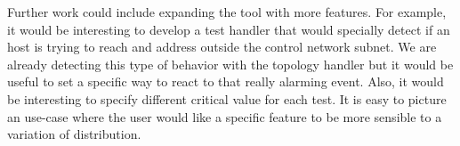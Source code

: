 \documentclass[12pt,journal,compsoc]{IEEEtran}
\begin{document}
\begin{empfile}
Further work could include expanding the tool with more features. For example, it would be interesting to develop a test handler that would specially detect if an host is trying to reach and address outside the control network subnet. We are already detecting this type of behavior with the topology handler but it would be useful to set a specific way to react to that really alarming event. Also, it would be interesting to specify different critical value for each test. It is easy to picture an use-case where the user would like a specific feature to be more sensible to a variation of distribution.



%


\appendices



\ifCLASSOPTIONcaptionsoff
  \newpage
\fi





\end{empfile}
\end{document}
